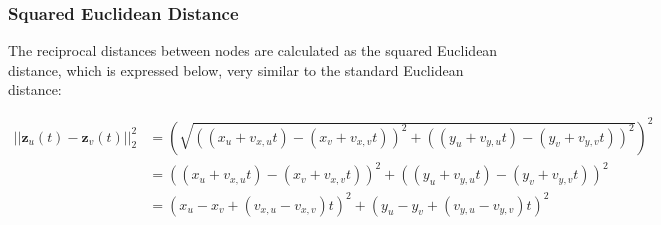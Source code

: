 \subsubsection{Squared Euclidean Distance}
\label{sec:Method:LSM:SquaredEuclideanDistance}
The reciprocal distances between nodes are calculated as the squared Euclidean distance, which is expressed below, very similar to the standard Euclidean distance:

\begin{align} 
||\textbf{z}_u(t) - \textbf{z}_v(t)||_2^2
&= 
\left(\sqrt{((x_u + v_{x,u}t) - (x_v + v_{x,v}t))^2 + ((y_u + v_{y,u}t) - (y_v + v_{y,v}t))^2}\right)^2
\\
&=
((x_u + v_{x,u}t) - (x_v + v_{x,v}t))^2 + ((y_u + v_{y,u}t) - (y_v + v_{y,v}t))^2
\\
&=
(x_u - x_v + (v_{x,u} - v_{x,v})t)^2 + (y_u - y_v + ( v_{y,u} - v_{y,v})t)^2
\label{eq:SquaredEuclideanDistance}
\end{align}
